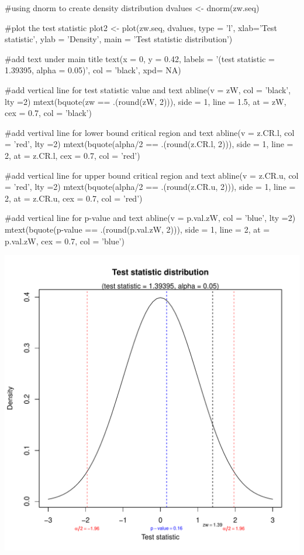 \documentclass[12pt, oneside]{report}\usepackage[]{graphicx}\usepackage[]{color}
\makeatletter
\def\maxwidth{ %
  \ifdim\Gin@nat@width>\linewidth
    \linewidth
  \else
    \Gin@nat@width
  \fi
}
\makeatother
\begin{document}
\begin{Schunk}
\begin{Sinput}
#using dnorm to create density distribution
dvalues <- dnorm(zw.seq)

#plot the test statistic
plot2 <- plot(zw.seq, dvalues, type = 'l', xlab='Test statistic', ylab = 'Density', main = 'Test statistic distribution')

#add text under main title
text(x = 0, y = 0.42, labels = '(test statistic = 1.39395, alpha = 0.05)', col = 'black', xpd= NA)

#add vertical line for test statistic value and text
abline(v = zW, col = 'black', lty =2)
mtext(bquote(zw == .(round(zW, 2))), side = 1, line = 1.5,
      at = zW, cex = 0.7, col = 'black')

#add vertival line for lower bound critical region and text
abline(v = z.CR.l, col = 'red', lty =2)
mtext(bquote(alpha/2 == .(round(z.CR.l, 2))), side = 1, line = 2,
      at = z.CR.l, cex = 0.7, col = 'red')

#add vertical line for upper bound critical region and text
abline(v = z.CR.u, col = 'red', lty =2)
mtext(bquote(alpha/2 == .(round(z.CR.u, 2))), side = 1, line = 2,
      at = z.CR.u, cex = 0.7, col = 'red')

#add vertical line for p-value and text
abline(v = p.val.zW, col = 'blue', lty =2)
mtext(bquote(p-value == .(round(p.val.zW, 2))), side = 1, line = 2,
      at = p.val.zW, cex = 0.7, col = 'blue')
\end{Sinput}

\includegraphics[width=\maxwidth]{figure/unnamed-chunk-7-2} \end{Schunk}
\end{document}
